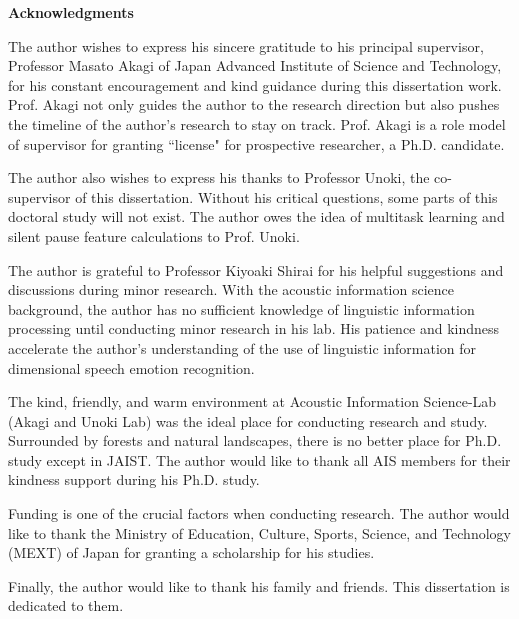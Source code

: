 \renewcommand{\nomname}{ACKNOWLEDGMENTS}
\markboth{\nomname}{\nomname}

\strut
\vspace{20pt}

\begin{center}
{\LARGE\bf Acknowledgments}
\end{center}
\vspace{20pt}

The author wishes to express his sincere gratitude to his principal supervisor,
Professor Masato Akagi of Japan Advanced Institute of Science and Technology,
for his constant encouragement and kind guidance during this dissertation work.
Prof. Akagi not only guides the author to the research direction but also
pushes the timeline of the author's research to stay on track. Prof. Akagi is a
role model of supervisor for granting ``license" for prospective researcher, a
Ph.D. candidate. 

The author also wishes to express his thanks to Professor Unoki, the
co-supervisor of this dissertation. Without his critical questions, some parts
of this doctoral study will not exist. The author owes the idea of multitask
learning and silent pause feature calculations to Prof. Unoki.

The author is grateful to Professor Kiyoaki Shirai for his helpful suggestions
and discussions during minor research. With the acoustic information science
background, the author has no sufficient knowledge of linguistic information
processing until conducting minor research in his lab. His patience and
kindness accelerate the author's understanding of the use of linguistic
information for dimensional speech emotion recognition.

The kind, friendly, and warm environment at Acoustic Information Science-Lab
(Akagi and Unoki Lab) was the ideal place for conducting research and study.
Surrounded by forests and natural landscapes, there is no better place for 
Ph.D. study except in JAIST. The author would like to thank all AIS members for
their kindness support during his Ph.D. study.

Funding is one of the crucial factors when conducting research. The author
would like to thank the Ministry of Education, Culture, Sports, Science, and
Technology (MEXT) of Japan for granting a scholarship for his studies.

Finally, the author would like to thank his family and friends. This
dissertation is dedicated to them. 

